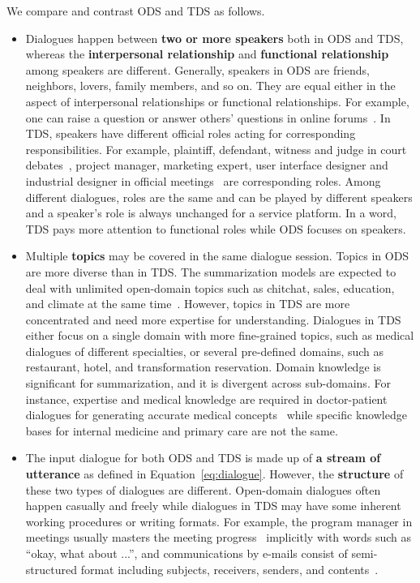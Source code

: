 We compare and contrast ODS and TDS as follows.
\begin{itemize}
\item Dialogues happen between \textbf{two or more speakers} both in ODS and TDS, whereas the \textbf{interpersonal relationship} and \textbf{functional relationship} among speakers are different. Generally, speakers in ODS are friends, neighbors, lovers, family members, and so on. 
They are equal either in the aspect of interpersonal relationships or functional relationships. For example, one can raise a question or answer others' questions in online forums~\cite{fabbri2021convosumm}.
In TDS, speakers have different official roles acting for corresponding responsibilities. For example, plaintiff, defendant, witness and judge in court debates~\cite{duan2019legal}, project manager, marketing expert, user interface designer and industrial designer in official meetings~\cite{carletta2005ami} are corresponding roles.
Among different dialogues, roles are the same and can be played by different speakers and a speaker's role is always unchanged for a service platform.
In a word, TDS pays more attention to functional roles while ODS focuses on speakers.


\item Multiple \textbf{topics} may be covered in the same dialogue session.
Topics in ODS are more diverse than in TDS. The summarization models are expected to deal with unlimited open-domain topics such as chitchat, sales, education, and climate at the same time~\cite{chen2021dialsumm}. 
However, topics in TDS are more concentrated and need more expertise for understanding.
Dialogues in TDS either focus on a single domain with more fine-grained topics, such as medical dialogues of different specialties,
or several pre-defined domains, such as restaurant, hotel, and transformation reservation.
Domain knowledge is significant for summarization, and it is divergent across sub-domains. For instance, expertise and medical knowledge are required in doctor-patient dialogues for generating accurate medical concepts~\cite{joshi2020dr} while specific knowledge bases for internal medicine and primary care are not the same.

\item The input dialogue for both ODS and TDS is made up of \textbf{a stream of utterance} as defined in Equation~\ref{eq:dialogue}. However, 
the \textbf{structure} of these two types of dialogues are different.
Open-domain dialogues often happen casually and freely while dialogues in TDS may have some inherent working procedures or writing formats. 
For example, the program manager in meetings usually masters the meeting progress~\cite{zhu2020end} implicitly with words such as ``okay, what about ...'', and communications by e-mails consist of semi-structured format including subjects, receivers, senders, and contents~\cite{zhang2021emailsum}. 


\end{itemize}

